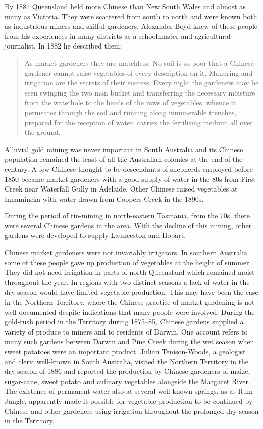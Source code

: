 By 1881 Queensland held more Chinese than New South Wales and almost
as many as Victoria.  They were scattered from south to north and were
known both as industrious miners and skilful gardeners.  Alexander
Boyd knew of these people from his experiences in many districts as a
schoolmaster and agricultural journalist.  In
1882 he described them:
\begin{quote}
	As market-gardeners they are matchless.  No soil is so poor
	that a Chinese gardener cannot raise vegetables of every
	description on it.  Manuring and irrigation are the secrets of
	their success.  Every night the gardeners may be seen swinging
	the two man bucket and transferring the necessary moisture
	from the waterhole to the heads of the rows of vegetables,
	whence it permeates through the soil and running along
	innumerable trenches, prepared for the reception of water,
	carries the fertilising medium all over the
	ground.
\end{quote}

Alluvial gold mining was never important in South Australia and its
Chinese population remained the least of all the Australian colonies
at the end of the century.  A few Chinese thought to be descendants of
shepherds employed before 1850 became market-gardeners with a good
supply of water in the 80s from First Creek near Waterfall Gully in
Adelaide.  Other Chinese raised vegetables at Innamincka with water
drawn from Coopers Creek in the 1890s.

During the period of tin-mining in north-eastern Tasmania, from the
70s, there were several Chinese gardens in the area.  With the decline
of this mining, other gardens were developed to supply Launceston and
Hobart.

Chinese market gardeners were not invariably irrigators.  In southern
Australia some of these people gave up production of vegetables at the
height of summer.  They did not need irrigation in parts of north
Queensland which remained moist throughout the year.  In regions with
two distinct seasons a lack of water in the dry season would have
limited vegetable production.  This may have been the case in the
Northern Territory, where the Chinese practice of market gardening is
not well documented despite indications that many people were
involved.  During the gold-rush period in the Territory during
1875--85, Chinese gardens supplied a variety of produce to miners and
to residents of Darwin.  One account refers to many such gardens
between Darwin and Pine Creek during the wet season when sweet
potatoes were an important product.  Julian Tenison-Woods, a geologist
and cleric well-known in South Australia, visited the Northern
Territory in the dry season of 1886 and reported the production by
Chinese gardeners of maize, sugar-cane, sweet potato and culinary
vegetables alongside the Margaret River. The existence of permanent
water also at several well-known springs, as at Rum Jungle, apparently
made it possible for vegetable production to be continued by Chinese
and other gardeners using irrigation throughout the prolonged dry
season in the Territory.

